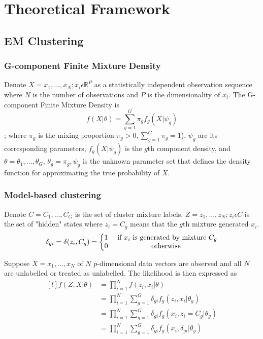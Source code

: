 \chapter{Theoretical Framework}
\label{sec:theoreticalframework} 

\section{EM Clustering}
\label{sec:modelbased_ch3}

\subsection{G-component Finite Mixture Density}
\label{sec:gcomponentmixturedensity}
Denote \(X={x_1, ..., x_N; x_i \epsilon \mathbb{R}^P}\) as a statistically independent observation sequence where \(N\) is the number of observations and \(P\) is the dimensionality of \(x_i\).
The G-component Finite Mixture Density is \[f(X|\theta) = \sum_{g=1}^{G} \pi_g f_g(X|\psi_g)\];
where \(\pi_g\) is the mixing proportion \(\pi_g > 0, \sum_{g=1}^{G} \pi_g=1\)), \(\psi_g\) are its corresponding parameters, \(f_g(X|\psi_g)\) is the \(g\)th component density, and \(\theta={\theta_1, ..., \theta_G}\), \(\theta_g={\pi_g,\psi_g}\) is the unknown parameter set that defines the density function for approximating the true probability of \(X\).


\subsection{Model-based clustering}
\label{sec:modelbasedclustering}
Denote \(C={C_1, ..., C_G}\) is the set of cluster mixture labels. \(Z={z_1, ..., z_N; z_i \epsilon C}\) is the set of "hidden" states where \(z_i=C_g\) means that the \(g\)th mixture generated \(x_i\). 
\[\delta_{gi}=\delta(z_i,C_g)=\left\{\begin{matrix}
    1 & \textup{ if } x_i \textup{ is generated by mixture } C_g \\ 
    0 & \textup{ otherwise }
    \end{matrix}\right.\]

Suppose \(X={x_1, ..., x_N}\) of \(N\) \(p\)-dimensional data vectors are observed and all \(N\) are unlabelled or treated as unlabelled. The likelihood is then expressed as 
\[\begin{matrix*}[l]
    f(Z,X | \theta) & =\prod_{i=1}^{N}f(z_i, x_i | \theta) \\ 
                    & =\prod_{i=1}^{N} \sum_{g=1}^{G} \delta_{gi}f_g(z_i,x_i|\theta_g)\\ 
                    & =\prod_{i=1}^{N} \sum_{g=1}^{G} \delta_{gi}f_g(x_i,z_i=C_g|\theta_g) \\ 
                    & =\prod_{i=1}^{N} \sum_{g=1}^{G}\delta_{gi}f_g(x_i,\delta_{gi}|\theta_g)
    \end{matrix*}\]

